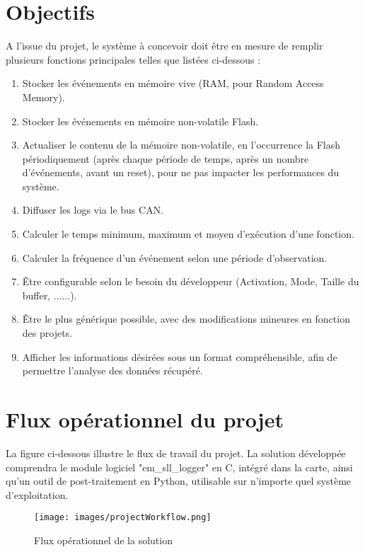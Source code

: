 \documentclass[a4paper, 12pt]{report}
\begin{document}
\section{Objectifs}
A l’issue du projet, le système à concevoir doit être en mesure de remplir plusieurs
fonctions principales telles que listées ci-dessous :
\begin{enumerate}
    \item Stocker les événements en mémoire vive (\acs{RAM}, pour Random Access Memory).
    \item Stocker les événements en mémoire non-volatile Flash.
    \item Actualiser le contenu de la mémoire non-volatile, en l'occurrence la Flash périodiquement (après chaque période de temps, après un nombre d'événements, avant un reset), pour ne pas impacter les performances du système.
    \item Diffuser les logs via le bus CAN.
    \item Calculer le temps minimum, maximum et moyen d'exécution d'une fonction.
    \item Calculer la fréquence d'un événement selon une période d'observation.
    \item Être configurable selon le besoin du développeur (Activation, Mode, Taille du buffer, ......).
    \item Être le plus générique possible, avec des modifications mineures en fonction des projets.
    \item Afficher les informations désirées sous un format compréhensible, afin de permettre l'analyse des données récupéré.
\end{enumerate}

\section{Flux opérationnel du projet}
La figure ci-dessous illustre le flux de travail du projet. La solution développée comprendra le module logiciel "em\_sll\_logger" en C, intégré dans la carte, ainsi qu'un outil de post-traitement en Python, utilisable sur n'importe quel système d'exploitation.
 \begin{figure}[H]
            \centering
            \texttt{[image: images/projectWorkflow.png]}
            \caption{Flux opérationnel de la solution}
            \label{fig:nvm}
        \end{figure}
\end{document}
